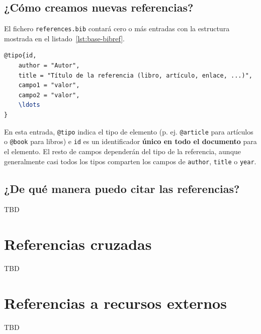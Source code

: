 \subsection{¿Cómo creamos nuevas referencias?}

El fichero \texttt{references.bib} contará cero o más entradas con la estructura mostrada en el listado~\ref{lst:base-bibref}.

\begin{lstlisting}[language=tex,caption=Estructura general de una referencia,label=lst:base-bibref]
@tipo{id,
    author = "Autor",
    title = "Título de la referencia (libro, artículo, enlace, ...)",
    campo1 = "valor",
    campo2 = "valor",
    \ldots
}
\end{lstlisting}

En esta entrada, \texttt{@tipo} indica el tipo de elemento (p. ej. \texttt{@article} para artículos o \texttt{@book} para libros) e \texttt{id} es un identificador \textbf{único en todo el documento} para el elemento. El resto de campos dependerán del tipo de la referencia, aunque generalmente casi todos los tipos comparten los campos de \texttt{author}, \texttt{title} o \texttt{year}.

\subsection{¿De qué manera puedo citar las referencias?}

TBD~\cite{mcculloch1943logical}

\section{Referencias cruzadas}

TBD

\section{Referencias a recursos externos}

TBD
